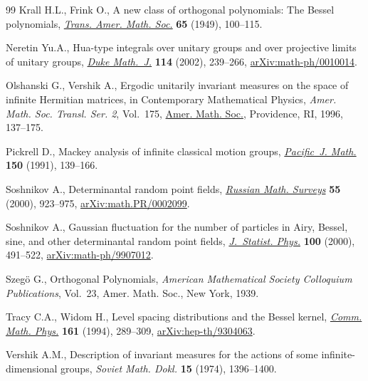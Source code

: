 \documentclass[11pt]{article}
\numberwithin{equation}{section}
\begin{document}
\begin{thebibliography}{99}
Krall H.L., Frink O., A new class of orthogonal polynomials: {T}he {B}essel
 polynomials, \href{https://doi.org/10.2307/1990516}{\textit{Trans. Amer. Math. Soc.}} \textbf{65} (1949), 100--115.

Neretin Yu.A., Hua-type integrals over unitary groups and over projective limits
 of unitary groups, \href{https://doi.org/10.1215/S0012-7094-02-11423-9}{\textit{Duke Math.~J.}} \textbf{114} (2002), 239--266,
 \href{https://arxiv.org/abs/math-ph/0010014}{arXiv:math-ph/0010014}.

Olshanski G., Vershik A., Ergodic unitarily invariant measures on the space of
 infinite {H}ermitian matrices, in Contemporary Mathematical Physics,
 \textit{Amer. Math. Soc. Transl. Ser. 2}, Vol.~175, \href{https://doi.org/10.1090/trans2/175/09}{Amer. Math. Soc.},
 Providence, RI, 1996, 137--175.

Pickrell D., Mackey analysis of infinite classical motion groups,
 \href{https://doi.org/10.2140/pjm.1991.150.139}{\textit{Pacific~J. Math.}} \textbf{150} (1991), 139--166.

Soshnikov A., Determinantal random point fields, \href{https://doi.org/10.1070/rm2000v055n05ABEH000321}{\textit{Russian Math. Surveys}}
 \textbf{55} (2000), 923--975, \href{https://arxiv.org/abs/math.PR/0002099}{arXiv:math.PR/0002099}.

Soshnikov A., Gaussian fluctuation for the number of particles in {A}iry,
 {B}essel, sine, and other determinantal random point fields,
 \href{https://doi.org/10.1023/A:1018672622921}{\textit{J.~Statist. Phys.}} \textbf{100} (2000), 491--522,
 \href{https://arxiv.org/abs/math-ph/9907012}{arXiv:math-ph/9907012}.

Szeg\"{o} G., Orthogonal {P}olynomials, \textit{American Mathematical Society
 Colloquium Publications}, Vol.~23, Amer. Math. Soc., New York, 1939.

Tracy C.A., Widom H., Level spacing distributions and the {B}essel kernel,
 \href{https://doi.org/10.1007/BF02099779}{\textit{Comm. Math. Phys.}} \textbf{161} (1994), 289--309,
 \href{https://arxiv.org/abs/hep-th/9304063}{arXiv:hep-th/9304063}.

Vershik A.M., Description of invariant measures for the actions of some
 infinite-dimensional groups, \textit{Soviet Math. Dokl.} \textbf{15} (1974),
 1396--1400.

\end{thebibliography}
\end{document}
